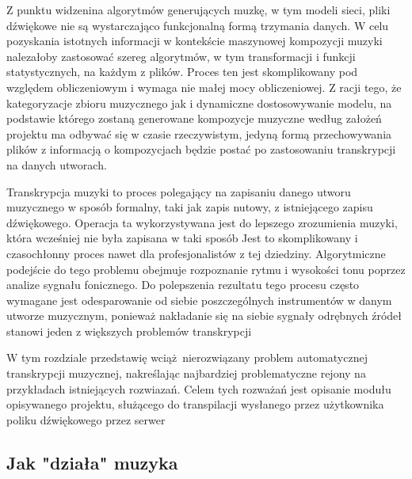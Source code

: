 \documentclass[12pt,a4paper,twoside]{mwart}
\begin{document}
Z punktu widzenina algorytmów generujących muzkę, w tym modeli sieci, pliki dźwiękowe nie są wystarczająco funkcjonalną formą trzymania danych. W celu pozyskania istotnych informacji w kontekście maszynowej kompozycji muzyki nalezałoby zastosować szereg algorytmów, w tym transformacji i funkcji statystycznych, na każdym z plików. Proces ten jest skomplikowany pod względem obliczeniowym i wymaga nie małej mocy obliczeniowej. Z racji tego, że kategoryzacje zbioru muzycznego jak i dynamiczne dostosowywanie modelu, na podstawie którego zostaną generowane kompozycje muzyczne według założeń projektu ma odbywać się w czasie rzeczywistym, jedyną formą przechowywania plików z informacją o kompozycjach będzie postać po zastosowaniu transkrypcji na danych utworach.


Transkrypcja muzyki to proces polegający na zapisaniu danego utworu muzycznego w sposób formalny, taki jak zapis nutowy, z istniejącego zapisu dźwiękowego. Operacja ta wykorzystywana jest do lepszego zrozumienia muzyki, która wcześniej nie była zapisana w taki sposób Jest to skomplikowany i czasochłonny proces nawet dla profesjonalistów z tej dziedziny. Algorytmiczne podejście do tego problemu obejmuje rozpoznanie rytmu i wysokości tonu poprzez analize sygnału fonicznego. Do polepszenia rezultatu tego procesu często wymagane jest odesparowanie od siebie poszczególnych instrumentów w danym utworze muzycznym, ponieważ nakładanie się na siebie sygnały odrębnych źródeł stanowi jeden z większych problemów transkrypcji

W tym rozdziale przedstawię wciąż nierozwiązany problem automatycznej transkrypcji muzycznej, nakreślając najbardziej problematyczne rejony na przykładach istniejących rozwiazań.  Celem tych rozważań jest opisanie modułu opisywanego projektu, służącego do transpilacji wysłanego przez użytkownika poliku dźwiękowego przez serwer

\subsection{Jak "działa" muzyka}
\end{document}
